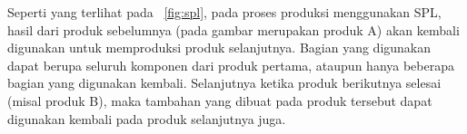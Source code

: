 Seperti yang terlihat pada \pic~\ref{fig:spl}, pada proses produksi menggunakan SPL, hasil dari produk sebelumnya (pada gambar merupakan produk A) akan kembali digunakan untuk memproduksi produk selanjutnya. Bagian yang digunakan dapat berupa seluruh komponen dari produk pertama, ataupun hanya beberapa bagian yang digunakan kembali. Selanjutnya ketika produk berikutnya selesai (misal produk B), maka tambahan yang dibuat pada produk tersebut dapat digunakan kembali pada produk selanjutnya juga.